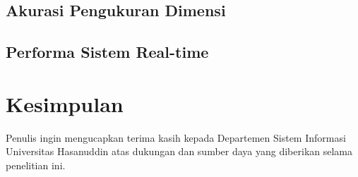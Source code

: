 \documentclass{iopjournal}
\begin{document}
\subsection{Akurasi Pengukuran Dimensi}

\subsection{Performa Sistem Real-time}

\section{Kesimpulan}
\label{sec:conclusion}

\ack
Penulis ingin mengucapkan terima kasih kepada Departemen Sistem Informasi Universitas Hasanuddin atas dukungan dan sumber daya yang diberikan selama penelitian ini.
\end{document}
